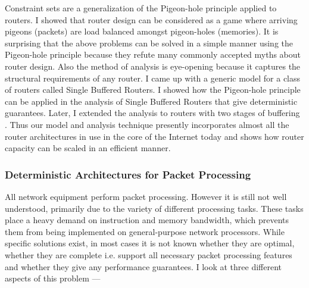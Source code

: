 \documentclass[a4paper, 12pt]{article}
\begin{document}
\begin{small}
Constraint sets are a generalization of the Pigeon-hole principle applied to
routers. I showed that router design can be considered as a game where arriving
pigeons (packets) are load balanced amongst pigeon-holes (memories).
It is surprising that the above problems can be solved \cite{pps, ppsmcast, dsm} in a simple
manner using the Pigeon-hole principle because they refute many commonly
accepted myths about router design.
Also the method of analysis is eye-opening because it captures the structural
requirements of any router.
I came up with a generic model for a class of routers called Single Buffered Routers.
I showed how the Pigeon-hole principle can be applied in the analysis of Single Buffered
Routers that give deterministic guarantees.  Later, I extended the analysis to
routers with two stages of buffering \cite{csets}.
Thus our model and analysis technique
presently incorporates almost all the router architectures in use in the
core of the Internet today and shows how router capacity can be scaled in
an efficient manner.


\subsubsection*{\small Deterministic Architectures for Packet Processing}

All network equipment perform packet processing. However
it is still not well understood, primarily due to the variety of
different processing tasks.
These tasks place a heavy demand on instruction and memory bandwidth, which
prevents them from being implemented on general-purpose network processors.
While specific solutions exist, in most cases it is not known whether they
are optimal, whether they are complete i.e. support all necessary packet processing features and whether they
give any performance guarantees. I look at three different aspects of this problem ---



\end{small}
\end{document}
